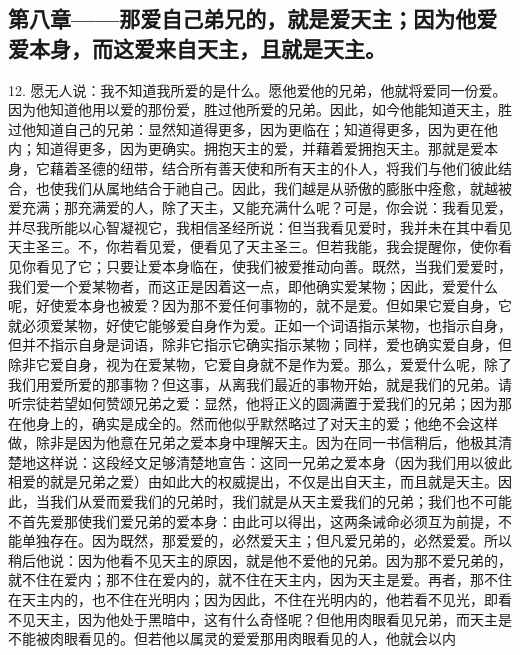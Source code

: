 
\subsection{第八章——那爱自己弟兄的，就是爱天主；因为他爱爱本身，而这爱来自天主，且就是天主。}

12. 愿无人说：我不知道我所爱的是什么。愿他爱他的兄弟，他就将爱同一份爱。因为他知道他用以爱的那份爱，胜过他所爱的兄弟。因此，如今他能知道天主，胜过他知道自己的兄弟：显然知道得更多，因为更临在；知道得更多，因为更在他内；知道得更多，因为更确实。拥抱天主的爱，并藉着爱拥抱天主。那就是爱本身，它藉着圣德的纽带，结合所有善天使和所有天主的仆人，将我们与他们彼此结合，也使我们从属地结合于祂自己。因此，我们越是从骄傲的膨胀中痊愈，就越被爱充满；那充满爱的人，除了天主，又能充满什么呢？可是，你会说：我看见爱，并尽我所能以心智凝视它，我相信圣经所说：但当我看见爱时，我并未在其中看见天主圣三。不，你若看见爱，便看见了天主圣三。但若我能，我会提醒你，使你看见你看见了它；只要让爱本身临在，使我们被爱推动向善。既然，当我们爱爱时，我们爱一个爱某物者，而这正是因着这一点，即他确实爱某物；因此，爱爱什么呢，好使爱本身也被爱？因为那不爱任何事物的，就不是爱。但如果它爱自身，它就必须爱某物，好使它能够爱自身作为爱。正如一个词语指示某物，也指示自身，但并不指示自身是词语，除非它指示它确实指示某物；同样，爱也确实爱自身，但除非它爱自身，视为在爱某物，它爱自身就不是作为爱。那么，爱爱什么呢，除了我们用爱所爱的那事物？但这事，从离我们最近的事物开始，就是我们的兄弟。请听宗徒若望如何赞颂兄弟之爱：显然，他将正义的圆满置于爱我们的兄弟；因为那在他身上的，确实是成全的。然而他似乎默然略过了对天主的爱；他绝不会这样做，除非是因为他意在兄弟之爱本身中理解天主。因为在同一书信稍后，他极其清楚地这样说：这段经文足够清楚地宣告：这同一兄弟之爱本身（因为我们用以彼此相爱的就是兄弟之爱）由如此大的权威提出，不仅是出自天主，而且就是天主。因此，当我们从爱而爱我们的兄弟时，我们就是从天主爱我们的兄弟；我们也不可能不首先爱那使我们爱兄弟的爱本身：由此可以得出，这两条诫命必须互为前提，不能单独存在。因为既然，那爱爱的，必然爱天主；但凡爱兄弟的，必然爱爱。所以稍后他说：因为他看不见天主的原因，就是他不爱他的兄弟。因为那不爱兄弟的，就不住在爱内；那不住在爱内的，就不住在天主内，因为天主是爱。再者，那不住在天主内的，也不住在光明内；因为因此，不住在光明内的，他若看不见光，即看不见天主，因为他处于黑暗中，这有什么奇怪呢？但他用肉眼看见兄弟，而天主是不能被肉眼看见的。但若他以属灵的爱爱那用肉眼看见的人，他就会以内